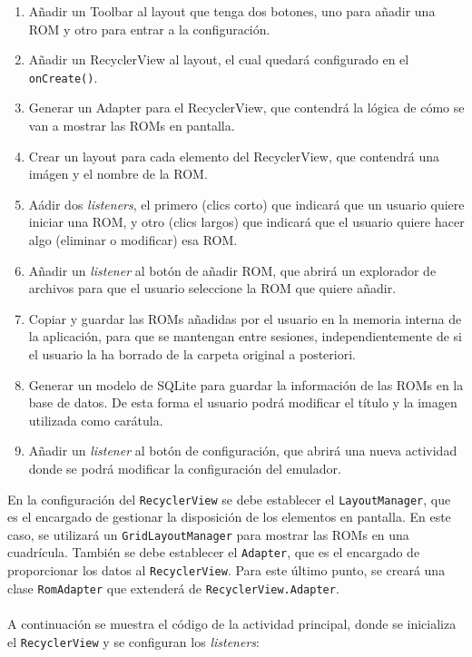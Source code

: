 \begin{enumerate}
    \item Añadir un Toolbar al layout que tenga dos botones, uno para añadir una ROM y otro para entrar a la configuración.
    \item Añadir un RecyclerView al layout, el cual quedará configurado en el \texttt{onCreate()}.
    \item Generar un Adapter para el RecyclerView, que contendrá la lógica de cómo se van a mostrar las ROMs en pantalla.
    \item Crear un layout para cada elemento del RecyclerView, que contendrá una imágen y el nombre de la ROM.
    \item Aádir dos \textit{listeners}, el primero (clics corto) que indicará que un usuario quiere iniciar una ROM, y otro (clics largos) que indicará que el usuario quiere hacer algo (eliminar o modificar) esa ROM.
    \item Añadir un \textit{listener} al botón de añadir ROM, que abrirá un explorador de archivos para que el usuario seleccione la ROM que quiere añadir.
    \item Copiar y guardar las ROMs añadidas por el usuario en la memoria interna de la aplicación, para que se mantengan entre sesiones, independientemente de si el usuario la ha borrado de la carpeta original a posteriori.
    \item Generar un modelo de SQLite para guardar la información de las ROMs en la base de datos. De esta forma el usuario podrá modificar el título y la imagen utilizada como carátula. 
    \item Añadir un \textit{listener} al botón de configuración, que abrirá una nueva actividad donde se podrá modificar la configuración del emulador.
\end{enumerate}

En la configuración del \texttt{RecyclerView} se debe establecer el \texttt{LayoutManager}, que es el encargado de gestionar la disposición de los elementos en pantalla. En este caso, se utilizará un \texttt{GridLayoutManager} para mostrar las ROMs en una cuadrícula. También se debe establecer el \texttt{Adapter}, que es el encargado de proporcionar los datos al \texttt{RecyclerView}. Para este último punto, se creará una clase \texttt{RomAdapter} que extenderá de \texttt{RecyclerView.Adapter}.
\\\\
A continuación se muestra el código de la actividad principal, donde se inicializa el \texttt{RecyclerView} y se configuran los \textit{listeners}:

